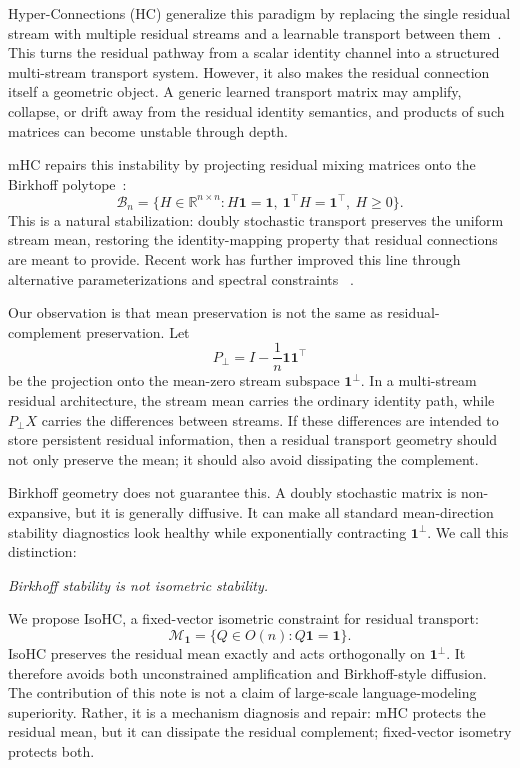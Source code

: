 \documentclass[10pt]{article}
\newcommand{\one}{\mathbf{1}}
\newcommand{\R}{\mathbb{R}}
\newcommand{\Birk}{\mathcal{B}_n}
\newcommand{\Mone}{\mathcal{M}_{\one}}
\newcommand{\pperp}{P_{\perp}}
\newcommand{\operp}{\one^{\perp}}
\begin{document}
Hyper-Connections (HC) generalize this paradigm by replacing the single
residual stream with multiple residual streams and a learnable transport between
them~\cite{hyperconnections}.  This turns the residual pathway from a scalar
identity channel into a structured multi-stream transport system.  However, it
also makes the residual connection itself a geometric object.  A generic learned
transport matrix may amplify, collapse, or drift away from the residual identity
semantics, and products of such matrices can become unstable through depth.

mHC repairs this instability by projecting residual mixing matrices onto the
Birkhoff polytope~\cite{mhc}:
\begin{equation}
    \Birk=\{H\in\R^{n\times n}:H\one=\one,\ \one^\top H=\one^\top,\ H\ge 0\}.
\end{equation}
This is a natural stabilization: doubly stochastic transport preserves the
uniform stream mean, restoring the identity-mapping property that residual
connections are meant to provide.  Recent work has further improved this line
through alternative parameterizations and spectral constraints
~\cite{shc,kromhc}.

Our observation is that mean preservation is not the same as residual-complement
preservation.  Let
\begin{equation}
    \pperp = I - \frac{1}{n}\one\one^\top
\end{equation}
be the projection onto the mean-zero stream subspace $\operp$.  In a
multi-stream residual architecture, the stream mean carries the ordinary
identity path, while $\pperp X$ carries the differences between streams.  If
these differences are intended to store persistent residual information, then a
residual transport geometry should not only preserve the mean; it should also
avoid dissipating the complement.

Birkhoff geometry does not guarantee this.  A doubly stochastic matrix is
non-expansive, but it is generally diffusive.  It can make all standard
mean-direction stability diagnostics look healthy while exponentially
contracting $\operp$.  We call this distinction:
\begin{center}
\emph{Birkhoff stability is not isometric stability.}
\end{center}

We propose IsoHC, a fixed-vector isometric constraint for residual transport:
\begin{equation}
    \Mone = \{Q\in O(n):Q\one=\one\}.
\end{equation}
IsoHC preserves the residual mean exactly and acts orthogonally on
$\operp$.  It therefore avoids both unconstrained amplification and
Birkhoff-style diffusion.  The contribution of this note is not a claim of
large-scale language-modeling superiority.  Rather, it is a mechanism diagnosis
and repair: mHC protects the residual mean, but it can dissipate the residual
complement; fixed-vector isometry protects both.
\end{document}
